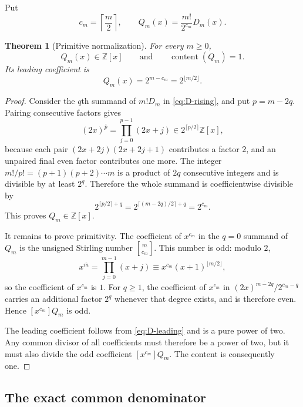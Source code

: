 \documentclass[11pt,oneside]{article}
\newtheorem{theorem}{Theorem}[section]
\theoremstyle{definition}
\theoremstyle{remark}
\newcommand{\Z}{\mathbb Z}
\newcommand{\Diag}{D}
\newcommand{\rising}[2]{#1^{\overline{#2}}}
\begin{document}
Put
\begin{equation}
 c_m=\left\lceil\frac m2\right\rceil,
 \qquad
 Q_m(x)=\frac{m!}{2^{c_m}}\Diag_m(x).
 \label{eq:Qm}
\end{equation}

\begin{theorem}[Primitive normalization]
\label{thm:primitive}
For every $m\ge0$,
\begin{equation}
 Q_m(x)\in\Z[x]
 \qquad\text{and}\qquad
 \operatorname{content}(Q_m)=1.
 \label{eq:primitive}
\end{equation}
Its leading coefficient is
\begin{equation}
 [x^m]Q_m(x)=2^{m-c_m}=2^{\lfloor m/2\rfloor}.
 \label{eq:Q-leading}
\end{equation}
\end{theorem}

\begin{proof}
Consider the $q$th summand of $m!\Diag_m$ in
\eqref{eq:D-rising}, and put $p=m-2q$.  Pairing consecutive factors gives
\[
 \rising{(2x)}p
 =\prod_{j=0}^{p-1}(2x+j)
 \in 2^{\lceil p/2\rceil}\Z[x],
\]
because each pair $(2x+2j)(2x+2j+1)$ contributes a factor $2$, and an
unpaired final even factor contributes one more.  The integer
$m!/p!=(p+1)(p+2)\cdots m$ is a product of $2q$ consecutive integers and is
divisible by at least $2^q$.  Therefore the whole summand is coefficientwise
divisible by
\[
 2^{\lceil p/2\rceil+q}
 =2^{\lceil(m-2q)/2\rceil+q}
 =2^{c_m}.
\]
This proves $Q_m\in\Z[x]$.

It remains to prove primitivity.  The coefficient of $x^{c_m}$ in the
$q=0$ summand of $Q_m$ is the unsigned Stirling number
$\genfrac{[}{]}{0pt}{}{m}{c_m}$.  This number is odd: modulo $2$,
\[
 \rising xm=\prod_{j=0}^{m-1}(x+j)
 \equiv x^{c_m}(x+1)^{\lfloor m/2\rfloor},
\]
so the coefficient of $x^{c_m}$ is $1$.  For $q\ge1$, the coefficient of
$x^{c_m}$ in
$\rising{(2x)}{m-2q}/2^{c_m-q}$ carries an additional factor $2^q$ whenever
that degree exists, and is therefore even.  Hence $[x^{c_m}]Q_m$ is odd.

The leading coefficient follows from \eqref{eq:D-leading} and is a pure power
of two.  Any common divisor of all coefficients must therefore be a power of
two, but it must also divide the odd coefficient $[x^{c_m}]Q_m$.  The content
is consequently one.
\end{proof}

\subsection{The exact common denominator}
\end{document}
